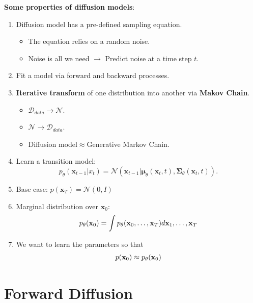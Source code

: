 \textbf{Some properties of diffusion models}:
	\begin{enumerate}
		\item Diffusion model has a pre-defined sampling equation.
			\begin{itemize}
				\item The equation relies on a random noise.
				\item Noise is all we need $\to$ Predict noise at a time step $t$.
			\end{itemize}
		\item Fit a model via forward and backward processes.
		\item \textbf{Iterative transform} of one distribution into another via \textbf{Makov Chain}.
			\begin{itemize}
				\item $\mathcal{D}_{data}\to \mathcal{N}$.
				\item $\mathcal{N}\to \mathcal{D}_{data}$.
				\item Diffusion model$\approx$Generative Markov Chain.
			\end{itemize}
		\item Learn a transition model:
			$$p_\theta(\mathbf{x}_{t-1}|x_t) = \mathcal{N}(\mathbf{x}_{t-1}|\boldsymbol{\mu}_{\theta}(\mathbf{x}_{t}, t), \boldsymbol{\Sigma}_\theta(\mathbf{x}_t,t)).$$
		\item Base case: $p(\mathbf{x}_T) = \mathcal{N}(0,I)$ 
		\item Marginal distribution over $\mathbf{x}_0$:
			$$p_\theta(\mathbf{x}_0) = \int p_\theta({\mathbf{x}}_0,\dots,\mathbf{x}_T)d{\mathbf{x}}_1,\dots,{\mathbf{x}}_T$$
		\item We want to learn the parameters so that
			$$p({\mathbf{x}}_0)\approx p_\theta({\mathbf{x}}_0)$$

	\end{enumerate}

\section{Forward Diffusion}


